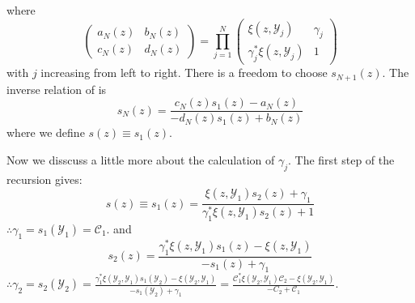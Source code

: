 \documentclass[
	preprint,%
	aps,
	prb,
	showpacs,	
	amsmath, amssymb]{revtex4-2}
\newcommand{\Y}{ {\mathcal{Y}} }
\newcommand{\C}{ {\mathcal{C}} }
\begin{document}
where
\begin{equation}\label{eq:factor-matrix-schur}
	\left(
		\begin{matrix}
			a_N(z) & b_N(z) \\
			c_N(z) & d_N(z)
		\end{matrix}
	\right)
	= \prod_{j=1}^{N}
	\left(
		\begin{matrix}
			\xi(z, \Y_j)            & \gamma_j \\
			\gamma_j^* \xi(z, \Y_j) & 1
		\end{matrix}
	\right)
\end{equation}
with $j$ increasing from left to right. 
There is a freedom to choose $s_{N+1}(z)$. 
The inverse relation of \label{eq:recursive-s} is
\begin{equation}\label{eq:inv-recursive-s}
	s_N(z) 
	= \frac{c_N(z) s_1(z) - a_N(z)}{-d_N(z) s_1(z) + b_N(z)}
\end{equation}
where we define $s(z) \equiv s_1(z)$.

Now we disscuss a little more about the calculation of $\gamma_j$.
The first step of the recursion gives:
\begin{equation}
	s(z)\equiv s_1(z) 
	= \frac{\xi(z, \Y_1) s_{2}(z) + \gamma_1 }
		{\gamma_1^* \xi(z, \Y_1) s_{2}(z) + 1}
\end{equation}
$\therefore  \gamma_1 = s_1(\Y_1) = \C_1$. and 
\begin{equation}
	s_2(z) 
	= \frac{\gamma_1^* \xi(z, \Y_1) s_1(z) - \xi(z, \Y_1) }
		{ -s_1(z) + \gamma_1}
\end{equation}
$\therefore \gamma_2 = s_2(\Y_2) 
= \frac{\gamma_1^* \xi(\Y_2, \Y_1) s_1(\Y_2) - \xi(\Y_2, \Y_1) }
{ -s_1(\Y_2) + \gamma_1} 
= \frac{\C_1^* \xi(\Y_2, \Y_1) \C_2 - \xi(\Y_2, \Y_1) }
{ -C_2 + \C_1}$.
\end{document}
